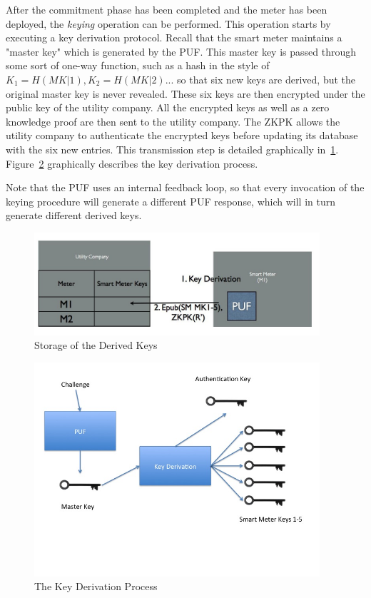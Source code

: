 After the commitment phase has been completed and the meter has been deployed, the \textit{keying} operation
can be performed. This operation starts by executing a key derivation protocol. Recall that the smart meter 
maintains a "master key" which is generated by the PUF. 
This master key is passed through some sort of one-way function, such as a hash
in the style of $K_1=H(MK|1), K_2=H(MK|2)...$ so that six new keys are derived, but the original master key is
never revealed. These six keys are then
encrypted under the public key of the utility company. All the encrypted keys as well as a zero knowledge proof
are then sent to the utility company. The ZKPK allows the utility company to authenticate the encrypted keys before
updating its database with the six new entries. This transmission step is detailed graphically in~\ref{fig:doeusage}.
Figure~\ref{fig:keyderivation} graphically describes the key derivation process.

Note that the PUF uses an internal feedback loop, so that every invocation of the keying procedure will generate a
different PUF response, which will in turn generate different derived keys.

\begin{figure}[!ht]
\includegraphics[width=400px]{images/doe_key_config.jpg}
\caption{Storage of the Derived Keys}
\label{fig:doeusage}
\end{figure}
\FloatBarrier

\begin{figure}[!ht]
\includegraphics[width=400px]{images/keyderivation.jpg}
\caption{The Key Derivation Process}
\label{fig:keyderivation}
\end{figure}
\FloatBarrier


